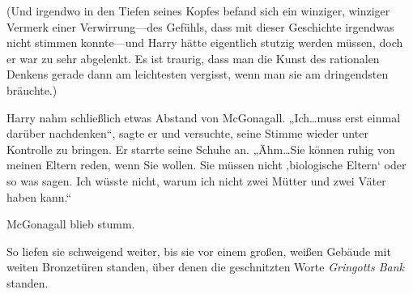 (Und irgendwo in den Tiefen seines Kopfes befand sich ein winziger, winziger Vermerk einer Verwirrung—des Gefühls, dass mit dieser Geschichte irgendwas nicht stimmen konnte—und Harry hätte eigentlich stutzig werden müssen, doch er war zu sehr abgelenkt. Es ist traurig, dass man die Kunst des rationalen Denkens gerade dann am leichtesten vergisst, wenn man sie am dringendsten bräuchte.)

Harry nahm schließlich etwas Abstand von McGonagall. „Ich…muss erst einmal darüber nachdenken“, sagte er und versuchte, seine Stimme wieder unter Kontrolle zu bringen. Er starrte seine Schuhe an. „Ähm…Sie können ruhig von meinen Eltern reden, wenn Sie wollen. Sie müssen nicht ‚biologische Eltern‘ oder so was sagen. Ich wüsste nicht, warum ich nicht zwei Mütter und zwei Väter haben kann.“

McGonagall blieb stumm.

So liefen sie schweigend weiter, bis sie vor einem großen, weißen Gebäude mit weiten Bronzetüren standen, über denen die geschnitzten Worte \emph{Gringotts Bank} standen.

